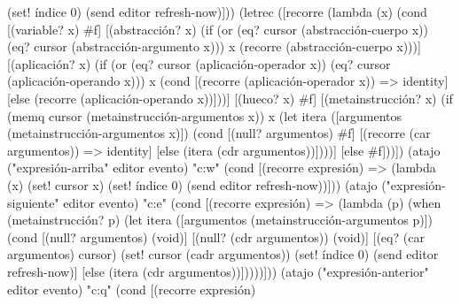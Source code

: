 \documentclass[10pt,oneside,openany,letterpaper]{book}
\begin{document}
                  (set! índice 0)
                  (send editor refresh-now)]))
    (letrec ([recorre (lambda (x)
                        (cond [(variable? x) #f]
                              [(abstracción? x)
                               (if (or (eq? cursor (abstracción-cuerpo x))
                                       (eq? cursor (abstracción-argumento x)))
                                   x
                                   (recorre (abstracción-cuerpo x)))]
                              [(aplicación? x)
                               (if (or (eq? cursor (aplicación-operador x))
                                       (eq? cursor (aplicación-operando x)))
                                   x
                                   (cond [(recorre (aplicación-operador x))
                                          => identity]
                                         [else (recorre (aplicación-operando x))]))]
                              [(hueco? x) #f]
                              [(metainstrucción? x)
                               (if (memq cursor (metainstrucción-argumentos x))
                                   x
                                   (let itera ([argumentos (metainstrucción-argumentos x)])
                                     (cond [(null? argumentos) #f]
                                           [(recorre (car argumentos))
                                            => identity]
                                           [else (itera (cdr argumentos))])))]
                              [else #f]))])
      (atajo ("expresión-arriba" editor evento) "c:w"
             (cond [(recorre expresión)
                    => (lambda (x)
                         (set! cursor x)
                         (set! índice 0)
                         (send editor refresh-now))]))
      (atajo ("expresión-siguiente" editor evento) "c:e"
             (cond [(recorre expresión)
                    => (lambda (p)
                         (when (metainstrucción? p)
                           (let itera ([argumentos (metainstrucción-argumentos p)])
                             (cond [(null? argumentos) (void)]
                                   [(null? (cdr argumentos)) (void)]
                                   [(eq? (car argumentos) cursor)
                                    (set! cursor (cadr argumentos))
                                    (set! índice 0)
                                    (send editor refresh-now)]
                                   [else (itera (cdr argumentos))]))))]))
      (atajo ("expresión-anterior" editor evento) "c:q"
             (cond [(recorre expresión)
\end{document}
